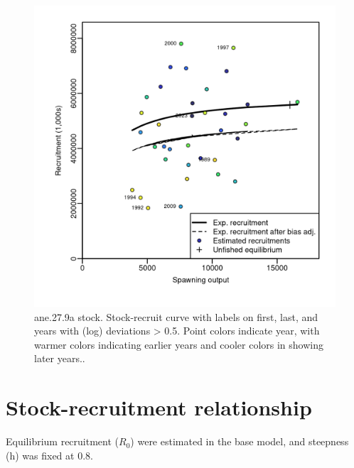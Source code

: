 \documentclass[
]{article}
\begin{document}
\begin{figure}[H]

{\centering \includegraphics[width=0.95\linewidth]{report/run/S1.0_4FLEETS/fig_stock-recluta} 

}

\caption{ane.27.9a stock. Stock-recruit curve with labels on first, last, and years with (log) deviations > 0.5. Point colors indicate year, with warmer colors indicating earlier years and cooler colors in showing later years..}\label{fig:unnamed-chunk-30}
\end{figure}

\hypertarget{stock-recruitment-relationship}{%
\section{Stock-recruitment
relationship}\label{stock-recruitment-relationship}}

Equilibrium recruitment (\(R_0\)) were estimated in the base model, and
steepness (h) was fixed at 0.8.
\end{document}
